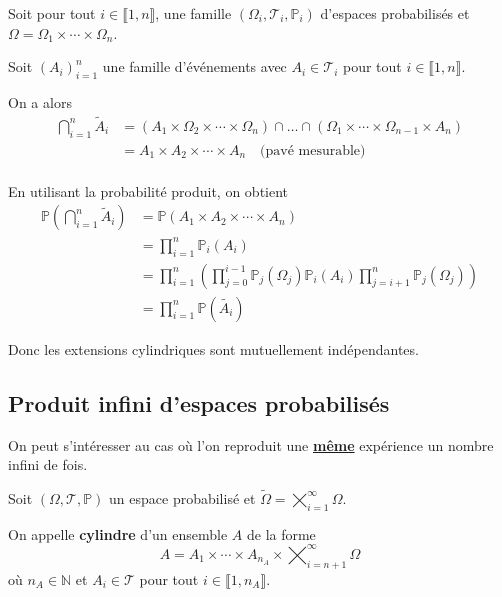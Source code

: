 \documentclass[a4paper, 12pt]{article}
\begin{document}
\begin{demonstration}
    Soit pour tout $i \in \llbracket 1, n \rrbracket$, une famille $(\Omega_i, \mathcal{T}_i, \mathbb{P}_i)$ d'espaces probabilisés et
    $\Omega = \Omega_1 \times \cdots \times \Omega_n$.

    Soit $(A_i)_{i=1}^n$ une famille d'événements avec $A_i \in \mathcal{T}_i$ pour tout $i \in \llbracket 1, n \rrbracket$.

    On a alors
    \begin{align*}
        \bigcap_{i=1}^n \tilde{A}_i &= (A_1 \times \Omega_2 \times \cdots \times \Omega_n) \cap \ldots \cap (\Omega_1 \times \cdots \times \Omega_{n-1} \times A_n) \\
        &= A_1 \times A_2 \times \cdots \times A_n \quad \text{(pavé mesurable)} \\
    \end{align*}

    En utilisant la probabilité produit, on obtient
    \begin{align*}
        \mathbb{P}\left( \bigcap_{i=1}^n \tilde{A}_i \right) &= \mathbb{P}(A_1 \times A_2 \times \cdots \times A_n) \\
        &= \prod_{i=1}^n \mathbb{P}_i(A_i) \\
        &= \prod_{i=1}^n \left( \prod_{j=0}^{i-1} \mathbb{P}_j(\Omega_j) \mathbb{P}_i(A_i) \prod_{j=i+1}^n \mathbb{P}_j(\Omega_j) \right) \\
        &= \prod_{i=1}^n \mathbb{P}(\tilde{A_i})
    \end{align*}

    Donc les extensions cylindriques sont mutuellement indépendantes.
\end{demonstration}

\subsection{Produit infini d'espaces probabilisés}

On peut s'intéresser au cas où l'on reproduit une \underline{\textbf{même}} expérience un nombre infini de fois.

\begin{definition}
    Soit $(\Omega, \mathcal{T}, \mathbb{P})$ un espace probabilisé et $\tilde{\Omega} = \bigtimes\limits_{i=1}^\infty \Omega$.

    On appelle \textbf{cylindre} d'un ensemble $A$ de la forme
    $$
    A = A_1 \times \cdots \times A_{n_A} \times \bigtimes_{i=n+1}^\infty \Omega
    $$
    où $n_A \in \mathbb{N}$ et $A_i \in \mathcal{T}$ pour tout $i \in \llbracket 1, n_A \rrbracket$.
\end{definition}
\end{document}
